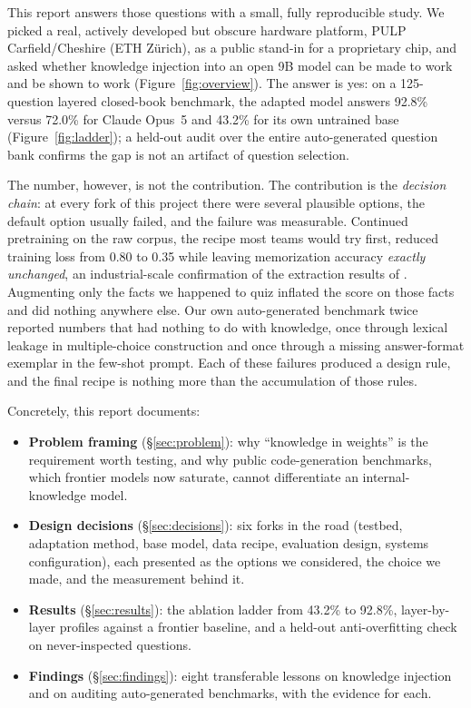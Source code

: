 This report answers those questions with a small, fully reproducible study.
We picked a real, actively developed but obscure hardware platform, PULP
Carfield/Cheshire (ETH Z\"urich), as a public stand-in for a proprietary
chip, and asked whether knowledge injection into an open 9B model can be made
to work and be shown to work (Figure~\ref{fig:overview}). The answer is yes:
on a 125-question layered
closed-book benchmark, the adapted model answers 92.8\% versus 72.0\% for
Claude Opus~5 and 43.2\% for its own untrained base
(Figure~\ref{fig:ladder}); a held-out audit over the entire auto-generated
question bank confirms the gap is not an artifact of question selection.

The number, however, is not the contribution. The contribution is the
\emph{decision chain}: at every fork of this project there were several
plausible options, the default option usually failed, and the failure was
measurable. Continued pretraining on the raw corpus, the recipe most teams
would try first, reduced training loss from 0.80 to 0.35 while leaving
memorization accuracy \emph{exactly unchanged}, an industrial-scale
confirmation of the extraction results of \citet{allenzhu2023physics31}.
Augmenting only the facts we happened to quiz inflated the score on those
facts and did nothing anywhere else. Our own auto-generated benchmark twice
reported numbers that had nothing to do with knowledge, once through lexical
leakage in multiple-choice construction and once through a missing
answer-format exemplar in the few-shot prompt. Each of these failures
produced a design rule, and the final recipe is nothing more than the
accumulation of those rules.

Concretely, this report documents:
\begin{itemize}
  \item \textbf{Problem framing} (\S\ref{sec:problem}): why
  ``knowledge in weights'' is the requirement worth testing, and why public
  code-generation benchmarks, which frontier models now saturate, cannot
  differentiate an internal-knowledge model.
  \item \textbf{Design decisions} (\S\ref{sec:decisions}): six forks in the
  road (testbed, adaptation method, base model, data recipe, evaluation
  design, systems configuration), each presented as the options we
  considered, the choice we made, and the measurement behind it.
  \item \textbf{Results} (\S\ref{sec:results}): the ablation ladder from
  43.2\% to 92.8\%, layer-by-layer profiles against a frontier baseline, and
  a held-out anti-overfitting check on never-inspected questions.
  \item \textbf{Findings} (\S\ref{sec:findings}): eight transferable lessons
  on knowledge injection and on auditing auto-generated benchmarks, with the
  evidence for each.
\end{itemize}

